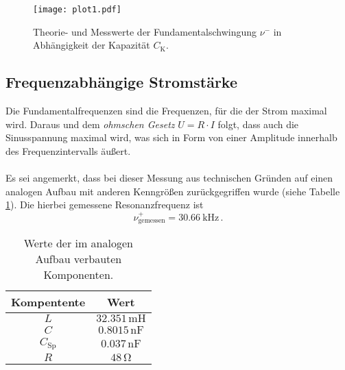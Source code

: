 \begin{figure}[H]
    \centering
    \texttt{[image: plot1.pdf]}
    \caption{Theorie- und Messwerte der Fundamentalschwingung $\nu^-$ in Abhängigkeit
    der Kapazität ${C_\text{K}}$.}
    \label{fig:plot1}
\end{figure}

\subsection{Frequenzabhängige Stromstärke}

Die Fundamentalfrequenzen sind die Frequenzen, für die der Strom maximal wird. 
Daraus und dem \textit{ohmschen Gesetz} $U = R \cdot I$ folgt, dass auch die Sinusspannung maximal wird,
was sich in Form von einer Amplitude innerhalb des Frequenzintervalls äußert.\\
\\
Es sei angemerkt, dass bei dieser Messung aus technischen Gründen auf einen analogen Aufbau mit anderen Kenngrößen
zurückgegriffen wurde (siehe Tabelle \ref{tab:komponenten_schaltung2}). Die hierbei gemessene Resonanzfrequenz ist 
\begin{equation*}
    \nu^+_{\text{gemessen}} = \qty{30.66}{\kilo\hertz} \, .
\end{equation*}

\begin{table}
    \centering
    \caption{Werte der im analogen Aufbau verbauten Komponenten.}
    \label{tab:komponenten_schaltung2}
    \begin{tabular}{c c}
        \toprule
        Kompentente &  Wert \\
        \midrule
        $L$               & $32.351 \, \unit{\milli\henry}$   \\
        $C$               & $0.8015 \, \unit{\nano\farad}$    \\
        $C_{\text{Sp}}$ & $ 0.037 \, \unit{\nano\farad}$    \\
        $R$               & $ 48 \, \unit{\ohm}$              \\
        \bottomrule
    \end{tabular}
\end{table}

